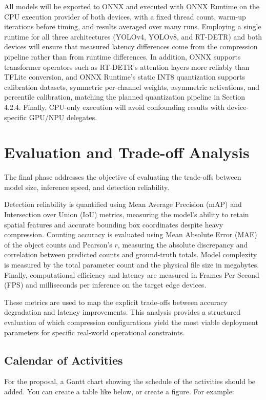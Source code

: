 All models will be exported to ONNX and executed with ONNX Runtime on the CPU execution provider of both devices, with a fixed thread count, warm-up iterations before timing, and results averaged over many runs. Employing a single runtime for all three architectures (YOLOv4, YOLOv8, and RT-DETR) and both devices will ensure that measured latency differences come from the compression pipeline rather than from runtime differences. In addition, ONNX supports transformer operators such as RT-DETR's attention layers more reliably than TFLite conversion, and ONNX Runtime's static INT8 quantization supports calibration datasets, symmetric per-channel weights, asymmetric activations, and percentile calibration, matching the planned quantization pipeline in Section 4.2.4. Finally, CPU-only execution will avoid confounding results with device-specific GPU/NPU delegates.

\section{Evaluation and Trade-off Analysis}
The final phase addresses the objective of evaluating the trade-offs between model size, inference speed, and detection reliability. 

Detection reliability is quantified using Mean Average Precision (mAP) and Intersection over Union (IoU) metrics, measuring the model's ability to retain spatial features and accurate bounding box coordinates despite heavy compression. Counting accuracy is evaluated using Mean Absolute Error (MAE) of the object counts and Pearson's $r$, measuring the absolute discrepancy and correlation between predicted counts and ground-truth totals. Model complexity is measured by the total parameter count and the physical file size in megabytes. Finally, computational efficiency and latency are measured in Frames Per Second (FPS) and milliseconds per inference on the target edge devices.

These metrics are used to map the explicit trade-offs between accuracy degradation and latency improvements. This analysis provides a structured evaluation of which compression configurations yield the most viable deployment parameters for specific real-world operational constraints.

\subsection{Calendar of Activities}

For the proposal, a Gantt chart showing the schedule of the activities should be added. You can create a table like below, or create a figure. For example:

